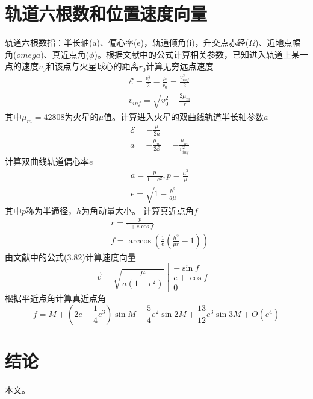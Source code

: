 \section{轨道六根数和位置速度向量}
轨道六根数指：半长轴(a)、偏心率(e)，轨道倾角(i)，升交点赤经($\Omega$)、近地点幅角($omega$)、真近点角($\phi$)。根据文献\cite{bruiter2012}中的公式计算相关参数，已知进入轨道上某一点的速度$v_0$和该点与火星球心的距离$r_0$计算无穷远点速度
\[\begin{aligned}
    &\mathcal{E}=\frac{v_0^2}{2}-\frac{\mu}{r_0} = \frac{v_{inf}^2}{2} \\
    &v_{inf}=\sqrt{v_0^2-\frac{2\mu_m}{r}}
\end{aligned}\]
其中$\mu_m=42808$为火星的$\mu$值。计算进入火星的双曲线轨道半长轴参数$a$
\[\begin{aligned}
    &\mathcal{E}=-\frac{\mu}{2a} \\
    &a=-\frac{\mu_m}{2\mathcal{E}}=-\frac{\mu_m}{v_{inf}^2}
\end{aligned}\]
计算双曲线轨道偏心率$e$
\[\begin{aligned}
    &a=\frac{p}{1-e^2},p=\frac{h^2}{\mu} \\
    &e=\sqrt{1-\frac{h^2}{a\mu}}
\end{aligned}\]
其中$p$称为半通径，$h$为角动量大小。
计算真近点角$f$
\[\begin{aligned}
    &r=\frac{p}{1+e\cos f} \\
    &f=\arccos(\frac{1}{e}(\frac{h^2}{\mu r}-1))
\end{aligned}\]
由文献\cite{bruiter2012}中的公式(3.82)计算速度向量
\[
    \vec{v}=\sqrt{\frac{\mu}{a(1-e^2)}}
    \left[\begin{matrix}
        -\sin f \\ e+\cos f \\ 0
    \end{matrix}\right]
\]
根据平近点角计算真近点角\cite{bsmart1977}
\[
    f=M+\left(2e-{\frac {1}{4}}e^{3}\right)\sin {M}
    +{\frac {5}{4}}e^{2}\sin {2M}+{\frac {13}{12}}e^{3}\sin {3M}+O(e^{4})
\]


\section{结\quad 论}
本文。



